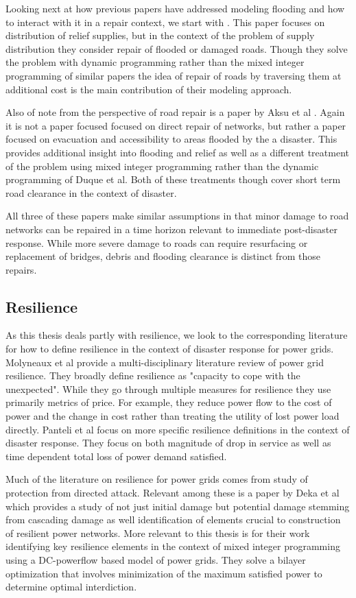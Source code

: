 \documentclass{article}
\begin{document}
		Looking next at how previous papers have addressed modeling flooding and how to interact with it in a repair context, we start with \cite{DuqueEA2016}. This paper focuses on distribution of relief supplies, but in the context of the problem of supply distribution they consider repair of flooded or damaged roads. Though they solve the problem with dynamic programming rather than the mixed integer programming of similar papers the idea of repair of roads by traversing them at additional cost is the main contribution of their modeling approach.
		
		Also of note from the perspective of road repair is a paper by Aksu et al \cite{AksuEA2014}. Again it is not a paper focused focused on direct repair of networks, but rather a paper focused on evacuation and accessibility to areas flooded by the a disaster. This provides additional insight into flooding and relief as well as a different treatment of the problem using mixed integer programming rather than the dynamic programming of Duque et al. Both of these treatments though cover short term road clearance in the context of disaster. 
		
		All three of these papers make similar assumptions in that minor damage to road networks can be repaired in a time horizon relevant to immediate post-disaster response. While more severe damage to roads can require resurfacing or replacement of bridges, debris and flooding clearance is distinct from those repairs.
	
	\subsection{Resilience}
		As this thesis deals partly with resilience, we look to the corresponding literature for how to define resilience in the context of disaster response for power grids. Molyneaux et al provide\cite{MolyneauxEA2016} a multi-disciplinary literature review of power grid resilience. They broadly define resilience as "capacity to cope with the unexpected". While they go through multiple measures for resilience they use primarily metrics of price. For example, they reduce power flow to the cost of power and the change in cost rather than treating the utility of lost power load directly. Panteli et al \cite{Panteli2017} focus on more specific resilience definitions in the context of disaster response. They focus on both magnitude of drop in service as well as time dependent total loss of power demand satisfied.
		
		Much of the literature on resilience for power grids comes from study of protection from directed attack. Relevant among these is a paper by Deka et al \cite{Deka2018} which provides a study of not just initial damage but potential damage stemming from cascading damage as well identification of elements crucial to construction of resilient power networks. More relevant to this thesis is \cite{Salmeron2004} for their work identifying key resilience elements in the context of mixed integer programming using a DC-powerflow based model of power grids. They solve a bilayer optimization that involves minimization of the maximum satisfied power to determine optimal interdiction.
\end{document}
